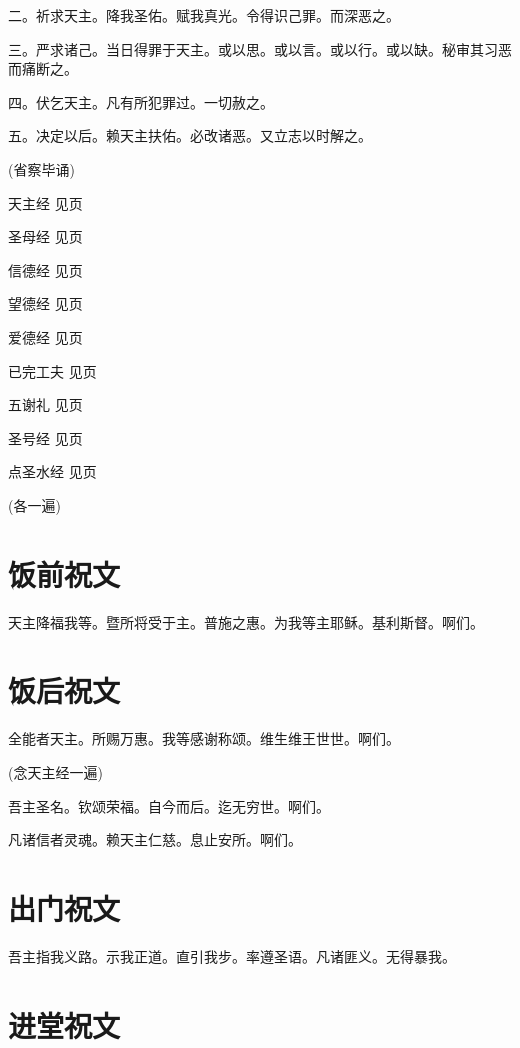 \documentclass[UTF8,17pt]{ctexart}
\begin{document}
⼆。祈求天主。降我圣佑。赋我真光。令得识己罪。⽽深恶之。

三。严求诸己。当⽇得罪于天主。或以思。或以⾔。或以⾏。或以缺。秘审其习恶⽽痛断之。

四。伏乞天主。凡有所犯罪过。⼀切赦之。

五。决定以后。赖天主扶佑。必改诸恶。又⽴志以时解之。

(省察毕诵)

天主经    \hfill   见\pageref{tian-zhu-jing}页

圣母经    \hfill   见\pageref{sheng-mu-jing}页

信德经    \hfill   见\pageref{xin-de-jing}页

望德经    \hfill   见\pageref{wang-de-jing}页

爱德经    \hfill   见\pageref{ai-de-jing}页

已完⼯夫  \hfill   见\pageref{yi-wan-gong-fu}页

五谢礼    \hfill   见\pageref{wu-xie-li}页

圣号经    \hfill   见\pageref{xiao-sheng-hao-jing}页

点圣水经   \hfill  见\pageref{dian-sheng-shui-jing}页

(各一遍)

\section{饭前祝⽂}

天主降福我等。暨所将受于主。普施之惠。为我等主耶稣。基利斯督。啊们。

\section{饭后祝文}

全能者天主。所赐万惠。我等感谢称颂。维生维王世世。啊们。

(念天主经⼀遍)

吾主圣名。钦颂荣福。自今而后。迄无穷世。啊们。

凡诸信者灵魂。赖天主仁慈。息⽌安所。啊们。

\section{出门祝文}

吾主指我义路。⽰我正道。直引我步。率遵圣语。凡诸匪义。⽆得暴我。

\section{进堂祝文}
\end{document}
